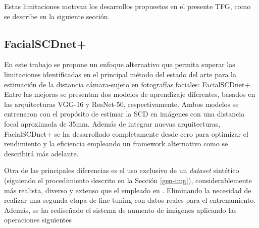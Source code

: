 Estas limitaciones motivan los desarrollos propuestos en el presente TFG, como se describe en la siguiente sección.

\subsection{FacialSCDnet+}

En este trabajo se propone un enfoque alternativo que permita superar las limitaciones identificadas en el principal método del estado del arte para la estimación de la distancia cámara-sujeto en fotografías faciales: FacialSCDnet+. Entre las mejoras se presentan dos modelos de aprendizaje diferentes, basados en las arquitecturas VGG-16 y ResNet-50, respectivamente. Ambos modelos se entrenaron con el propósito de estimar la SCD en imágenes con una distancia focal aproximada de 35mm. Además de integrar nuevas arquitecturas, FacialSCDnet+ se ha desarrollado completamente desde cero para optimizar el rendimiento y la eficiencia empleando un framework alternativo como se describirá más adelante.

Otra de las principales diferencias es el uso exclusivo de un \textit{dataset} sintético (siguiendo el procedimiento descrito en la Sección \ref{gen-img}), considerablemente más realista, diverso y extenso que el empleado en \cite{14}. Eliminando la necesidad de realizar una segunda etapa de fine-tuning con datos reales para el entrenamiento. Además, se ha rediseñado
el sistema de aumento de imágenes aplicando las operaciones siguientes

